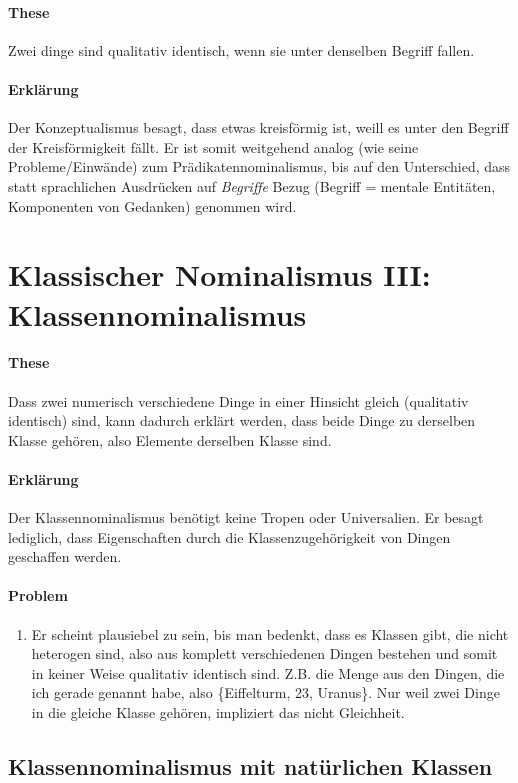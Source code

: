 \documentclass[../main.tex]{subfiles}
\begin{document}
\paragraph{These} Zwei dinge sind qualitativ identisch, wenn sie unter denselben Begriff fallen.
\paragraph{Erklärung} Der Konzeptualismus besagt, dass etwas kreisförmig ist, weill es unter den Begriff der Kreisförmigkeit fällt. Er ist somit weitgehend analog (wie seine Probleme/Einwände) zum Prädikatennominalismus, bis auf den Unterschied, dass statt sprachlichen Ausdrücken auf \textit{Begriffe} Bezug (Begriff = mentale Entitäten, Komponenten von Gedanken) genommen wird.

\section{Klassischer Nominalismus III: Klassennominalismus}
\paragraph{These} Dass zwei numerisch verschiedene Dinge in einer Hinsicht gleich (qualitativ identisch) sind, kann dadurch erklärt werden, dass beide Dinge zu derselben Klasse gehören, also Elemente derselben Klasse sind.
\paragraph{Erklärung} Der Klassennominalismus benötigt keine Tropen oder Universalien. Er besagt lediglich, dass Eigenschaften durch die Klassenzugehörigkeit von Dingen geschaffen werden. 
\paragraph{Problem}
\begin{enumerate}
	\item Er scheint plausiebel zu sein, bis man bedenkt, dass es Klassen gibt, die nicht heterogen sind, also aus komplett verschiedenen Dingen bestehen und somit in keiner Weise qualitativ identisch sind. Z.B. die Menge aus den Dingen, die ich gerade genannt habe, also \{Eiffelturm, 23, Uranus\}. Nur weil zwei Dinge in die gleiche Klasse gehören, impliziert das nicht Gleichheit. 
\end{enumerate}

\subsection{Klassennominalismus mit natürlichen Klassen}
\end{document}
